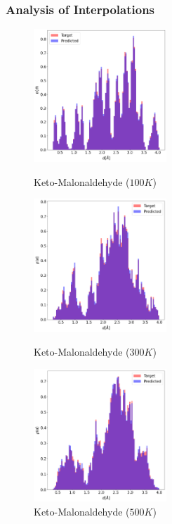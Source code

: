 \documentclass[usenames, dvipsnames, t]{beamer}
\begin{document}
\begin{frame}
	\frametitle{Analysis of Interpolations}
	\begin{figure}[htb]
		\begin{minipage}{0.3\textwidth}
			\includegraphics[width=0.9\linewidth, height=5cm]{KetoMalonaldehyde100K_BiLSTM.png} 
			\caption{Keto-Malonaldehyde ($100K$)}
		\end{minipage}
		\begin{minipage}{0.3\textwidth}
			\includegraphics[width=0.9\linewidth, height=5cm]{KetoMalonaldehyde300K_BiLSTM.png}
			\caption{Keto-Malonaldehyde ($300K$)}
		\end{minipage}
		\begin{minipage}{0.3\textwidth}
			\includegraphics[width=0.9\linewidth, height=5cm]{KetoMalonaldehyde500K_BiLSTM.png}
			\caption{Keto-Malonaldehyde ($500K$)}
		\end{minipage}
	\end{figure}
\end{frame}
\end{document}
